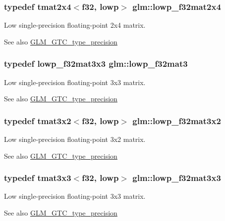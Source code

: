 \subsubsection[{lowp\+\_\+f32mat2x4}]{\setlength{\rightskip}{0pt plus 5cm}typedef tmat2x4$<${\bf f32}, lowp$>$ {\bf glm\+::lowp\+\_\+f32mat2x4}}\label{namespaceglm_a61927ceea97a94ec30f22de589342891}
Low single-\/precision floating-\/point 2x4 matrix. \begin{DoxySeeAlso}{See also}
\hyperlink{group__gtc__type__precision}{G\+L\+M\+\_\+\+G\+T\+C\+\_\+type\+\_\+precision} 
\end{DoxySeeAlso}
\hypertarget{namespaceglm_a84500ab23c0f0f3c585f8ad02f33b88c}{}
\subsubsection[{lowp\+\_\+f32mat3}]{\setlength{\rightskip}{0pt plus 5cm}typedef {\bf lowp\+\_\+f32mat3x3} {\bf glm\+::lowp\+\_\+f32mat3}}\label{namespaceglm_a84500ab23c0f0f3c585f8ad02f33b88c}
Low single-\/precision floating-\/point 3x3 matrix. \begin{DoxySeeAlso}{See also}
\hyperlink{group__gtc__type__precision}{G\+L\+M\+\_\+\+G\+T\+C\+\_\+type\+\_\+precision} 
\end{DoxySeeAlso}
\hypertarget{namespaceglm_a7ab718e123585d94f76770315cc37967}{}
\subsubsection[{lowp\+\_\+f32mat3x2}]{\setlength{\rightskip}{0pt plus 5cm}typedef tmat3x2$<${\bf f32}, lowp$>$ {\bf glm\+::lowp\+\_\+f32mat3x2}}\label{namespaceglm_a7ab718e123585d94f76770315cc37967}
Low single-\/precision floating-\/point 3x2 matrix. \begin{DoxySeeAlso}{See also}
\hyperlink{group__gtc__type__precision}{G\+L\+M\+\_\+\+G\+T\+C\+\_\+type\+\_\+precision} 
\end{DoxySeeAlso}
\hypertarget{namespaceglm_ab7d83082e77b2817c3dfcdcd9c432329}{}
\subsubsection[{lowp\+\_\+f32mat3x3}]{\setlength{\rightskip}{0pt plus 5cm}typedef tmat3x3$<${\bf f32}, lowp$>$ {\bf glm\+::lowp\+\_\+f32mat3x3}}\label{namespaceglm_ab7d83082e77b2817c3dfcdcd9c432329}
Low single-\/precision floating-\/point 3x3 matrix. \begin{DoxySeeAlso}{See also}
\hyperlink{group__gtc__type__precision}{G\+L\+M\+\_\+\+G\+T\+C\+\_\+type\+\_\+precision} 
\end{DoxySeeAlso}
\hypertarget{namespaceglm_a5102fa6a00423f045c058f77d8158bdd}{}
